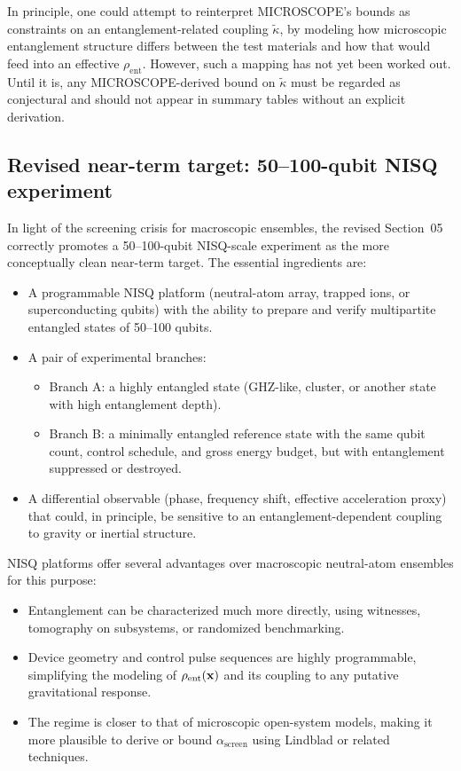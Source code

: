 \documentclass[11pt]{article}
\begin{document}
In principle, one could attempt to reinterpret MICROSCOPE's bounds as constraints on an entanglement-related coupling $\tilde{\kappa}$, by modeling how microscopic entanglement structure differs between the test materials and how that would feed into an effective $\rho_{\text{ent}}$. However, such a mapping has not yet been worked out. Until it is, any MICROSCOPE-derived bound on $\tilde{\kappa}$ must be regarded as conjectural and should not appear in summary tables without an explicit derivation.

\subsection{Revised near-term target: 50--100-qubit NISQ experiment}

In light of the screening crisis for macroscopic ensembles, the revised Section~05 correctly promotes a 50--100-qubit NISQ-scale experiment as the more conceptually clean near-term target. The essential ingredients are:
\begin{itemize}
 \item A programmable NISQ platform (neutral-atom array, trapped ions, or superconducting qubits) with the ability to prepare and verify multipartite entangled states of 50--100 qubits.
 \item A pair of experimental branches:
   \begin{itemize}
    \item Branch A: a highly entangled state (GHZ-like, cluster, or another state with high entanglement depth).
    \item Branch B: a minimally entangled reference state with the same qubit count, control schedule, and gross energy budget, but with entanglement suppressed or destroyed.
   \end{itemize}
 \item A differential observable (phase, frequency shift, effective acceleration proxy) that could, in principle, be sensitive to an entanglement-dependent coupling to gravity or inertial structure.
\end{itemize}

NISQ platforms offer several advantages over macroscopic neutral-atom ensembles for this purpose:
\begin{itemize}
 \item Entanglement can be characterized much more directly, using witnesses, tomography on subsystems, or randomized benchmarking.
 \item Device geometry and control pulse sequences are highly programmable, simplifying the modeling of $\rho_{\text{ent}}(\vb{x})$ and its coupling to any putative gravitational response.
 \item The regime is closer to that of microscopic open-system models, making it more plausible to derive or bound $\alpha_{\text{screen}}$ using Lindblad or related techniques.
\end{itemize}
\end{document}
